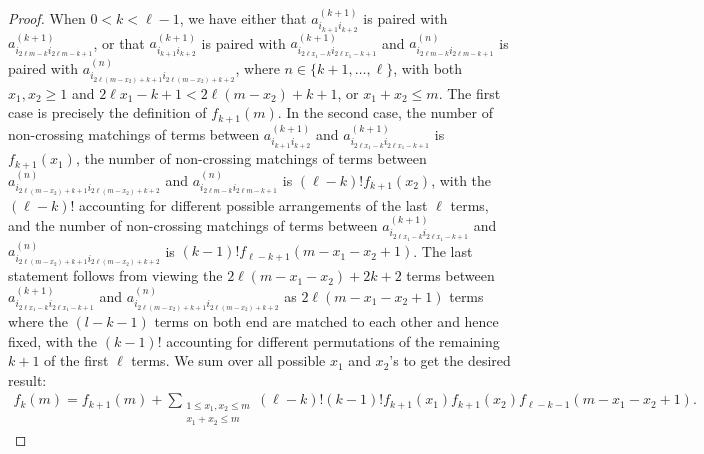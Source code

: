 \documentclass[11pt,reqno]{amsart}
\numberwithin{equation}{section}
\theoremstyle{plain}
\begin{document}
\begin{proof}
When $0<k<\ell-1$, we have either that $a^{(k+1)}_{i_{k+1}i_{k+2}}$ is paired with $a^{(k+1)}_{i_{2\ell m-k}i_{2\ell m-k+1}}$, or that $a^{(k+1)}_{i_{k+1}i_{k+2}}$ is paired with $a^{(k+1)}_{i_{2\ell x_1 -k}i_{2\ell x_1-k+1}}$ and $a^{(n)}_{i_{2\ell m-k}i_{2\ell m-k+1}}$ is paired with $a^{(n)}_{i_{2\ell (m-x_2) + k+1}i_{2\ell(m- x_2) + k+2}}$, where $n\in \{k+1, \dotsc, \ell\}$, with both $x_1, x_2 \geq 1$ and $2\ell x_1-k+1 < 2\ell (m-x_2) + k+1$, or $x_1+x_2 \leq m$. The first case is precisely the definition of $f_{k+1}(m)$. In the second case, the number of non-crossing matchings of terms between $a^{(k+1)}_{i_{k+1}i_{k+2}}$ and $a^{(k+1)}_{i_{2\ell x_1 -k}i_{2\ell x_1-k+1}}$ is $f_{k+1}(x_1)$, the number of non-crossing matchings of terms between $a^{(n)}_{i_{2\ell (m-x_2) + k+1}i_{2\ell(m- x_2) + k+2}}$ and $a^{(n)}_{i_{2\ell m-k}i_{2\ell m-k+1}}$ is $(\ell-k)!f_{k+1}(x_2)$, with the $(\ell-k)!$ accounting for different possible arrangements of the last $\ell$ terms, and the number of non-crossing matchings of terms between $a^{(k+1)}_{i_{2\ell x_1 -k}i_{2\ell x_1-k+1}}$ and $a^{(n)}_{i_{2\ell (m-x_2) + k+1}i_{2\ell(m- x_2) + k+2}}$ is $(k-1)!f_{\ell-k+1}(m-x_1-x_2+1)$. The last statement follows from viewing the $2\ell(m-x_1-x_2)+2k+2$ terms between $a^{(k+1)}_{i_{2\ell x_1 -k}i_{2\ell x_1-k+1}}$ and $a^{(n)}_{i_{2\ell (m-x_2) + k+1}i_{2\ell(m- x_2) + k+2}}$ as $2\ell (m-x_1-x_2+1)$ terms where the $(l-k-1)$ terms on both end are matched to each other and hence fixed, with the $(k-1)!$ accounting for different permutations of the remaining $k+1$ of the first  $\ell$ terms. We sum over all possible $x_1$ and $x_2$'s to get the desired result:
\begin{align}
f_k(m)=f_{k+1}(m)+
 \sum_{\substack{1\leq x_1,x_2\leq m\\ x_1+x_2\leq m}}(\ell-k)!(k-1)!f_{k+1}(x_1)f_{k+1}(x_2)f_{\ell-k-1}(m-x_1-x_2+1).
\end{align}


\end{proof}
\end{document}
